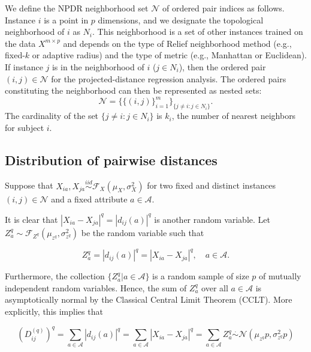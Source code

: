 \documentclass[10pt,letterpaper]{article}\usepackage[]{graphicx}\usepackage[]{color}
\begin{document}
We define the NPDR neighborhood set $\mathcal{N}$ of ordered pair indices as follows. Instance $i$ is a point in $p$ dimensions, and we designate the topological neighborhood of $i$ as $N_{i}$. This neighborhood is a set of other instances trained on the data $X^{m \times p}$ and depends on the type of Relief neighborhood method (e.g., fixed-$k$ or adaptive radius) and the type of metric (e.g., Manhattan or Euclidean). If instance $j$ is in the neighborhood of $i$ ($j \in N_{i}$), then the ordered pair $(i,j) \in \mathcal{N}$ for the projected-distance regression analysis. The ordered pairs constituting the neighborhood can then be represented as nested sets:
\begin{equation}\label{eq:N}
\mathcal{N}=\{\{(i, j)\}_{i=1}^{m}\}_{\{j \ne i : j \in N_{i}\}}.
\end{equation}
The cardinality of the set $\{j \ne i : j \in N_{i}\}$ is $k_i$, the number of nearest neighbors for subject $i$. 

\subsection{Distribution of pairwise distances}

Suppose that $X_{ia}, X_{ja} \overset{iid}{\sim} \mathcal{F}_X(\mu_X,\sigma^2_X)$ for two fixed and distinct instances $(i,j) \in \mathcal{N}$ and a fixed attribute $a \in \mathcal{A}$. 

It is clear that $|X_{ia} - X_{ja}|^q = |d_{ij}(a)|^q$ is another random variable. Let $Z^q_a \sim \mathcal{F}_{Z^q}(\mu_{z^q},\sigma^2_{z^q})$ be the random variable such that

\begin{equation}\label{eq:diffDistr}
Z^q_a = |d_{ij}(a)|^q = |X_{ia} - X_{ja}|^q, \quad a \in \mathcal{A}.
\end{equation}

Furthermore, the collection $\{Z^q_a | a \in \mathcal{A}\}$ is a random sample of size $p$ of mutually independent random variables. Hence, the sum of $Z^q_a$ over all $a \in \mathcal{A}$ is asymptotically normal by the Classical Central Limit Theorem (CCLT). More explicitly, this implies that

\begin{equation}\label{eq:DqAsympt}
\left(D^{(q)}_{ij}\right)^q = \sum_{a \in \mathcal{A}} |d_{ij}(a)|^q = \sum_{a \in \mathcal{A}} |X_{ia} - X_{ja}|^q = \sum_{a \in \mathcal{A}} Z^q_a \overset{.}{\sim} \mathcal{N}\left(\mu_{z^q}p,\sigma^2_{z^q}p\right)
\end{equation}
\end{document}

